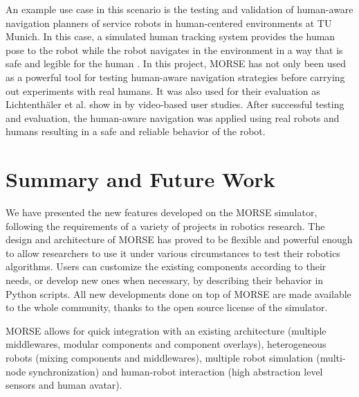 \documentclass{llncs}
\newcommand{\serge}[1]{\nb{Serge}{blue}{#1}}
\begin{document}
An example use case in this scenario is the testing and validation of human-aware
navigation planners of service robots in human-centered environments at TU Munich.
In this case, a simulated human tracking system provides the human pose to the
robot while the robot navigates in the environment in a way that is safe and
legible for the human \cite{kruse10exploiting}. In this project, MORSE has not only been used as a
powerful tool for testing human-aware navigation strategies before carrying out
experiments with real humans. It was also used for their evaluation as
Lichtenth{\"a}ler et al. show in \cite{lichtenthaeler2012increasing} by
video-based user studies. After successful testing and evaluation, the
human-aware navigation was applied using real robots and humans resulting in
a safe and reliable behavior of the robot.



\section{Summary and Future Work}
\label{section:discussion}

We have presented the new features developed on the MORSE simulator,
following the requirements of a variety of projects in robotics research.
The design and architecture of MORSE has proved to be flexible and powerful
enough to allow researchers to use it under various circumstances to test their
robotics algorithms. Users can customize the existing components according to
their needs, or develop new ones when necessary, by describing their behavior
in Python scripts.
All new developments done on top of MORSE are made available to the whole
community, thanks to the open source license of the simulator.

MORSE allows for quick integration with an existing architecture (multiple
middlewares, modular components and component overlays), heterogeneous robots
(mixing components and middlewares), multiple robot simulation (multi-node
synchronization) and human-robot interaction (high abstraction level sensors
and human avatar).
\end{document}

